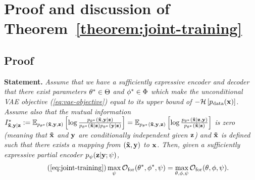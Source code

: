 \section{Proof and discussion of Theorem~\ref{theorem:joint-training}}  \label{proof:joint-training}

\subsection{Proof}

\textbf{Statement.} \textit{Assume that we have a sufficiently expressive
  encoder and decoder that there exist parameters ${\theta}^*\in\Theta$
  and ${\phi}^*\in\Phi$ which make the unconditional VAE objective
  (\cref{eq:vae-objective}) equal to its upper bound of $-\mathcal{H}\left[ p_{\rm{data}}({\mathbf{x}})
  \right]$. Assume also that the mutual information ${I^*_{\mathbf{\tilde{x}}{},\mathbf{y}{}|\mathbf{z}{}}{} :=
  \mathbb{E}_{p_{\theta^*}(\mathbf{\tilde{x}}{}, {\mathbf{y}}, {\mathbf{z}})} \left[ \log
    \frac{p_{\theta^*}(\mathbf{\tilde{x}}{},{\mathbf{y}}|{\mathbf{z}}) }{ p_{\theta^*}(\mathbf{\tilde{x}}{}|{\mathbf{z}})p_{\theta^*}({\mathbf{y}}|{\mathbf{z}}) } \right] =
  \mathbb{E}_{p_{\theta^*}(\mathbf{\tilde{x}}{}, {\mathbf{y}}, {\mathbf{z}})} \left[ \log
    \frac{p_{\theta^*}(\mathbf{\tilde{x}}{}|{\mathbf{z}}, {\mathbf{y}}) }{ p_{\theta^*}(\mathbf{\tilde{x}}{}|{\mathbf{z}}) } \right]}$ is zero (meaning that $\mathbf{\tilde{x}}{}$ and ${\mathbf{y}}$ are
  conditionally independent given ${\mathbf{z}}$) and $\mathbf{\tilde{x}}{}$ is defined such that there
  exists a mapping from $(\mathbf{\tilde{x}}{},{\mathbf{y}})$ to ${\mathbf{x}}$. Then, given a
  sufficiently expressive partial encoder $p_\psi({\mathbf{z}}|{\mathbf{y}}; \psi)$, }
\begin{equation} \tag{\ref{eq:joint-training}}
  \max_{\psi } \mathcal{O}_\mathrm{for}(\optimal{\theta}, \optimal{\phi}, \psi ) = \max_{\theta, \phi, \psi } \mathcal{O}_\mathrm{for}(\theta, \phi, \psi ).
\end{equation}


